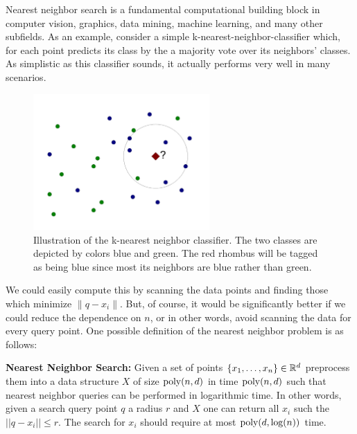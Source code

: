 \documentclass{article}
\begin{document}



Nearest neighbor search is a fundamental computational building block in computer vision, graphics, data mining, machine learning, and many other subfields.
As an example, consider a simple k-nearest-neighbor-classifier which, for each point predicts its class
by the a majority vote over its neighbors' classes. As simplistic as this classifier sounds, it actually performs 
very well in many scenarios. 

\begin{figure}[h!]
  \centering
  \includegraphics[width=0.6\textwidth]{11_images/knns_classifier.pdf}
  \caption{Illustration of the k-nearest neighbor classifier. The two classes are depicted by colors blue and green.
  The red rhombus will be tagged as being blue since most its neighbors are blue rather than green.}
\end{figure}

We could easily compute this by scanning the data points and finding those which minimize $\|q - x_i\|$.
But, of course, it would be significantly better if we could reduce the dependence on $n$, or in other words, avoid scanning the data for every query point.
One possible definition of the nearest neighbor problem is as follows:
\begin{definition}{\bf Nearest Neighbor Search:} Given a set of points $\{x_1,\ldots,x_n\} \in {\mathbb{R}}^{d}$ 
preprocess them into a data structure
$X$ of size ${\operatorname{poly}}(n,d)$ in time ${\operatorname{poly}}(n,d)$ such that nearest neighbor queries can
be performed in logarithmic time. In other words, given a search query point $q$ a radius $r$ and $X$ one can 
return all $x_i$ such the $||q - x_i || \le r$. The search for $x_i$ should require at most ${\operatorname{poly}}(d,\log(n))$ time.
\end{definition}
\end{document}
